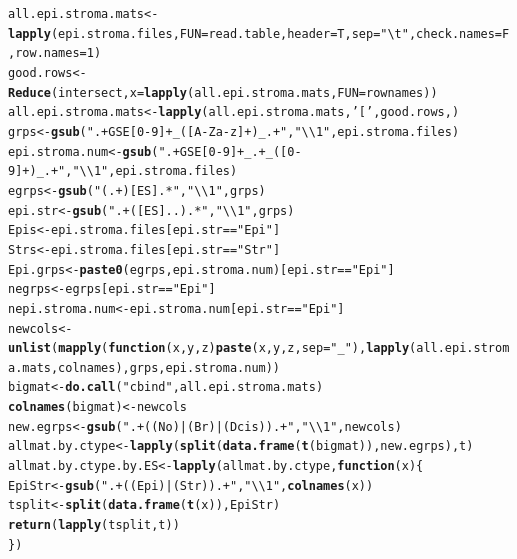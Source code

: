 \documentclass{article}\usepackage[]{graphicx}\usepackage[]{color}
\makeatletter
\newcommand{\hlnum}[1]{\textcolor[rgb]{0.686,0.059,0.569}{#1}}%
\newcommand{\hlstr}[1]{\textcolor[rgb]{0.192,0.494,0.8}{#1}}%
\newcommand{\hlopt}[1]{\textcolor[rgb]{0,0,0}{#1}}%
\newcommand{\hlstd}[1]{\textcolor[rgb]{0.345,0.345,0.345}{#1}}%
\newcommand{\hlkwa}[1]{\textcolor[rgb]{0.161,0.373,0.58}{\textbf{#1}}}%
\newcommand{\hlkwb}[1]{\textcolor[rgb]{0.69,0.353,0.396}{#1}}%
\newcommand{\hlkwc}[1]{\textcolor[rgb]{0.333,0.667,0.333}{#1}}%
\newcommand{\hlkwd}[1]{\textcolor[rgb]{0.737,0.353,0.396}{\textbf{#1}}}%
\newenvironment{kframe}{%
 \def\at@end@of@kframe{}%
 \ifinner\ifhmode%
  \def\at@end@of@kframe{\end{minipage}}%
  \begin{minipage}{\columnwidth}%
 \fi\fi%
 \def\FrameCommand##1{\hskip\@totalleftmargin \hskip-\fboxsep
 \colorbox{shadecolor}{##1}\hskip-\fboxsep
     \hskip-\linewidth \hskip-\@totalleftmargin \hskip\columnwidth}%
 \MakeFramed {\advance\hsize-\width
   \@totalleftmargin\z@ \linewidth\hsize
   \@setminipage}}%
 {\par\unskip\endMakeFramed%
 \at@end@of@kframe}
\newenvironment{knitrout}{}{} %
\makeatother
\begin{document}
\begin{knitrout}
\begin{kframe}
\begin{alltt}
\hlstd{all.epi.stroma.mats} \hlkwb{<-} \hlkwd{lapply}\hlstd{(epi.stroma.files,}\hlkwc{FUN}\hlstd{=read.table,}\hlkwc{header}\hlstd{=T,}\hlkwc{sep}\hlstd{=}\hlstr{"\textbackslash{}t"}\hlstd{,}\hlkwc{check.names}\hlstd{=F,}\hlkwc{row.names}\hlstd{=}\hlnum{1}\hlstd{)}
\hlstd{good.rows} \hlkwb{<-} \hlkwd{Reduce}\hlstd{(intersect,}\hlkwc{x}\hlstd{=}\hlkwd{lapply}\hlstd{(all.epi.stroma.mats,}\hlkwc{FUN}\hlstd{=rownames))}
\hlstd{all.epi.stroma.mats} \hlkwb{<-} \hlkwd{lapply}\hlstd{(all.epi.stroma.mats,}\hlstr{'['}\hlstd{,good.rows,)}
\hlstd{grps} \hlkwb{<-} \hlkwd{gsub}\hlstd{(}\hlstr{".+GSE[0-9]+_([A-Za-z]+)_.+"}\hlstd{,}\hlstr{"\textbackslash{}\textbackslash{}1"}\hlstd{,epi.stroma.files)}
\hlstd{epi.stroma.num} \hlkwb{<-} \hlkwd{gsub}\hlstd{(}\hlstr{".+GSE[0-9]+_.+_([0-9]+)_.+"}\hlstd{,}\hlstr{"\textbackslash{}\textbackslash{}1"}\hlstd{,epi.stroma.files)}
\hlstd{egrps} \hlkwb{<-} \hlkwd{gsub}\hlstd{(}\hlstr{"(.+)[ES].*"}\hlstd{,}\hlstr{"\textbackslash{}\textbackslash{}1"}\hlstd{,grps)}
\hlstd{epi.str} \hlkwb{<-} \hlkwd{gsub}\hlstd{(}\hlstr{".+([ES]..).*"}\hlstd{,}\hlstr{"\textbackslash{}\textbackslash{}1"}\hlstd{,grps)}
\hlstd{Epis} \hlkwb{<-} \hlstd{epi.stroma.files[epi.str}\hlopt{==}\hlstr{"Epi"}\hlstd{]}
\hlstd{Strs} \hlkwb{<-} \hlstd{epi.stroma.files[epi.str}\hlopt{==}\hlstr{"Str"}\hlstd{]}
\hlstd{Epi.grps} \hlkwb{<-} \hlkwd{paste0}\hlstd{(egrps,epi.stroma.num)[epi.str}\hlopt{==}\hlstr{"Epi"}\hlstd{]}
\hlstd{negrps} \hlkwb{<-} \hlstd{egrps[epi.str}\hlopt{==}\hlstr{"Epi"}\hlstd{]}
\hlstd{nepi.stroma.num} \hlkwb{<-} \hlstd{epi.stroma.num[epi.str}\hlopt{==}\hlstr{"Epi"}\hlstd{]}
\hlstd{newcols} \hlkwb{<-} \hlkwd{unlist}\hlstd{(}\hlkwd{mapply}\hlstd{(}\hlkwa{function}\hlstd{(}\hlkwc{x}\hlstd{,}\hlkwc{y}\hlstd{,}\hlkwc{z}\hlstd{)}\hlkwd{paste}\hlstd{(x,y,z,}\hlkwc{sep}\hlstd{=}\hlstr{"_"}\hlstd{),}\hlkwd{lapply}\hlstd{(all.epi.stroma.mats,colnames),grps,epi.stroma.num))}
\hlstd{bigmat} \hlkwb{<-} \hlkwd{do.call}\hlstd{(}\hlstr{"cbind"}\hlstd{,all.epi.stroma.mats)}
\hlkwd{colnames}\hlstd{(bigmat)}\hlkwb{<-} \hlstd{newcols}
\hlstd{new.egrps} \hlkwb{<-} \hlkwd{gsub}\hlstd{(}\hlstr{".+((No)|(Br)|(Dcis)).+"}\hlstd{,}\hlstr{"\textbackslash{}\textbackslash{}1"}\hlstd{,newcols)}
\hlstd{allmat.by.ctype} \hlkwb{<-} \hlkwd{lapply}\hlstd{(}\hlkwd{split}\hlstd{(}\hlkwd{data.frame}\hlstd{(}\hlkwd{t}\hlstd{(bigmat)),new.egrps),t)}
\hlstd{allmat.by.ctype.by.ES} \hlkwb{<-} \hlkwd{lapply}\hlstd{(allmat.by.ctype,}\hlkwa{function}\hlstd{(}\hlkwc{x}\hlstd{)\{}
 \hlstd{EpiStr} \hlkwb{<-} \hlkwd{gsub}\hlstd{(}\hlstr{".+((Epi)|(Str)).+"}\hlstd{,}\hlstr{"\textbackslash{}\textbackslash{}1"}\hlstd{,}\hlkwd{colnames}\hlstd{(x))}
 \hlstd{tsplit} \hlkwb{<-} \hlkwd{split}\hlstd{(}\hlkwd{data.frame}\hlstd{(}\hlkwd{t}\hlstd{(x)),EpiStr)}
 \hlkwd{return}\hlstd{(}\hlkwd{lapply}\hlstd{(tsplit,t))}
 \hlstd{\})}


\end{alltt}
\end{kframe}
\end{knitrout}
\end{document}
